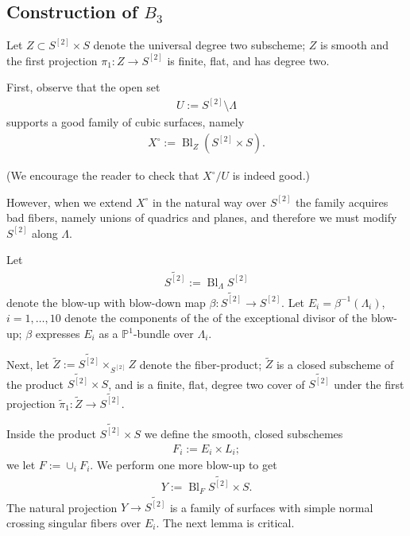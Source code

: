 \documentclass[12 pt]{amsart}
\renewcommand{\P}{\mathbb{P}}
\newcommand{\<}{\left\langle}
\renewcommand{\>}{\right\rangle}
\DeclareMathOperator{\Bl}{Bl}
\begin{document}
\subsection{Construction of $B_3$}
\label{sec:construction-b_3}

Let $Z \subset S^{[2]} \times S$ denote the universal degree two
subscheme; $Z$ is smooth and the first projection
$\pi_1 : Z \to S^{[2]}$ is finite, flat, and has degree two.



First, observe that the open set
\begin{align}
  \label{eq:UB3}
  U := S^{[2]} \setminus \Lambda
\end{align}
supports a good family of cubic surfaces, namely
\begin{align}
  \label{eq:XUB3}
  X^{\circ} := \Bl_{Z}(S^{[2]} \times S).
\end{align}

(We encourage the reader to check that $X^{\circ}/U$ is indeed good.)

However, when we extend $X^{\circ}$ in the natural way over $S^{[2]}$
the family acquires bad fibers, namely unions of quadrics and planes,
and therefore we must modify $S^{[2]}$ along $\Lambda$.

Let
\begin{align}
  \label{eq:S2tilde}
  \widetilde{S^{[2]}} := \Bl_{\Lambda}S^{[2]}
\end{align}
denote the blow-up with blow-down map
$\beta: \widetilde{S^{[2]}} \to S^{[2]}$.  Let
$E_{i} = \beta^{-1}(\Lambda_{i})$, $i=1, \dots, 10$ denote the
components of the of the exceptional divisor of the blow-up; $\beta$
expresses $E_{i}$ as a $\P^{1}$-bundle over $\Lambda_{i}$.

Next, let $\widetilde{Z} := \widetilde{S^{[2]}} \times_{S^{[2]}} Z$
denote the fiber-product; $\widetilde{Z}$ is a closed subscheme of the
product $\widetilde{S^{[2]}} \times S$, and is a finite, flat, degree
two cover of $\widetilde{S^{[2]}}$ under the first projection
$\tilde{\pi}_{1} : \widetilde{Z} \to \widetilde{S^{[2]}}.$

Inside the product $\widetilde{S^{[2]}} \times S$ we define the
smooth, closed subschemes
\begin{align}
  \label{eq:Fi}
  F_{i} := E_{i} \times L_{i};
\end{align}
we let $F := \cup_{i}F_{i}$.  We perform one more blow-up to get 
\begin{align}
  \label{eq:Xtilde}
  Y := \Bl_{F}\widetilde{S^{[2]}} \times S.
\end{align}
The natural projection $ Y \to \widetilde{S^{[2]}}$ is a family of
surfaces with simple normal crossing singular fibers over $E_{i}$.
The next lemma is critical.
\end{document}
